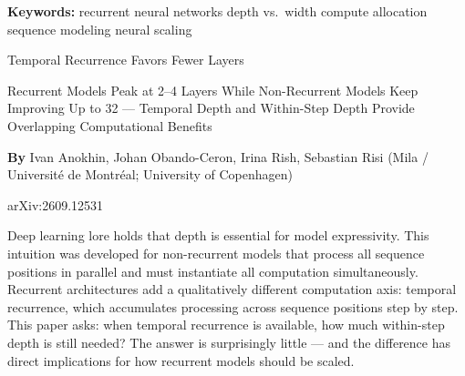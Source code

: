 \documentclass[10pt,twocolumn]{article}
\begin{document}
\setlength{\parindent}{0pt}
\setlength{\parskip}{4pt}

{\small\color{keywordgray}\textbf{Keywords:}
  recurrent neural networks \textbullet{}
  depth vs.\ width \textbullet{}
  compute allocation \textbullet{}
  sequence modeling \textbullet{}
  neural scaling}\par\vspace{4pt}

{\LARGE\bfseries\raggedright
  Temporal Recurrence Favors
  Fewer Layers}\par\vspace{4pt}

{\large\itshape\raggedright
  Recurrent Models Peak at 2--4 Layers While Non-Recurrent Models
  Keep Improving Up to 32 --- Temporal Depth and Within-Step
  Depth Provide Overlapping Computational Benefits}\par\vspace{6pt}

{\small\textbf{By} Ivan Anokhin, Johan Obando-Ceron, Irina Rish,
  Sebastian Risi
  (Mila / Universit\'e de Montr\'eal; University of Copenhagen)}\par\vspace{2pt}

{\small\color{keywordgray}arXiv:2609.12531}
\par\vspace{2pt}\noindent{\color{rulered}\rule{\columnwidth}{0.6pt}}\vspace{6pt}

Deep learning lore holds that depth is essential for model expressivity.
This intuition was developed for non-recurrent models that process all
sequence positions in parallel and must instantiate all computation
simultaneously. Recurrent architectures add a qualitatively different
computation axis: temporal recurrence, which accumulates processing
across sequence positions step by step. This paper asks: when temporal
recurrence is available, how much within-step depth is still needed?
The answer is surprisingly little --- and the difference has direct
implications for how recurrent models should be scaled.
\end{document}
